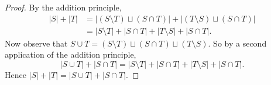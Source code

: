 \documentclass[12pt]{article}
\theoremstyle{remark}
\begin{document}
\begin{proof}
By the addition principle,
\begin{align*}
|S|+|T| 
&= |(S\setminus T)\sqcup(S\cap T)|+|(T\setminus S)\sqcup(S\cap T)| \\
&= |S\setminus T| + |S\cap T| + |T\setminus S| + |S\cap T|.
\end{align*}
Now observe that $S\cup T=(S\setminus T)\sqcup (S\cap T)\sqcup
(T\setminus S)$.  So by a second application of the addition principle,
\[
|S\cup T|+|S\cap T|
= |S\setminus T| + |S\cap T| + |T\setminus S| + |S\cap T|.
\]
Hence $|S|+|T|=|S\cup T| + |S\cap T|$.
\end{proof}


\end{document}
